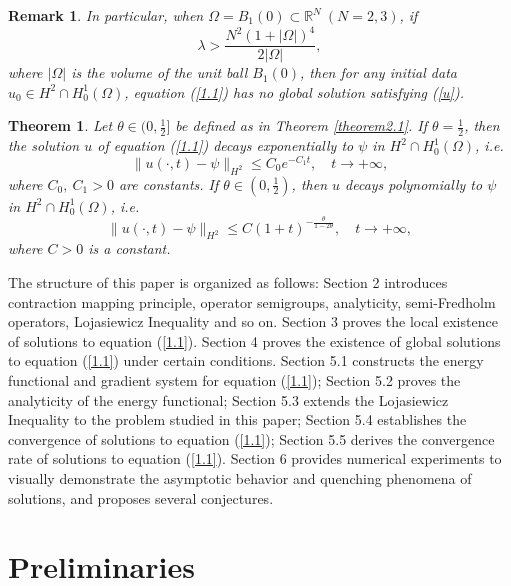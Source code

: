 \documentclass{article}
\numberwithin{equation}{section}
\newtheorem{theorem}{Theorem}[section]
\newtheorem{remark}{Remark}[section]
\begin{document}
\begin{remark}
    In particular, when $\Omega=B_1(0)\subset\mathbb{R}^{N}\ (N=2,3)$, if $$\lambda>\frac{N^2(1+|\Omega|)^4}{2|\Omega|},$$
where $|\Omega|$ is the volume of the unit ball $B_1(0)$, then for any initial data $u_0\in H^2\cap H_0^1(\Omega)$, equation (\ref{1.1}) has no global solution satisfying (\ref{u}).
\end{remark}

\begin{theorem}\label{theorem1.2}
    Let $\theta\in (0,\frac{1}{2}]$ be defined as in Theorem \ref{theorem2.1}. If $\theta=\frac{1}{2}$, then the solution $u$ of equation (\ref{1.1}) decays exponentially to $\psi$ in $H^2\cap H_0^1(\Omega)$, i.e.
    \begin{equation}
        \|u(\cdot,t)-\psi\|_{H^2}\le C_0e^{-C_1t},\quad t\to +\infty,\label{2.33}
    \end{equation}
    where $C_0,\ C_1>0$ are constants.
    If $\theta\in (0,\frac{1}{2})$, then $u$ decays polynomially to $\psi$ in $H^2\cap H_0^1(\Omega)$, i.e.
    \begin{equation}
        \|u(\cdot,t)-\psi\|_{H^2}\le C(1+t)^{-\frac{\theta}{1-2\theta}},\quad t\to +\infty,\label{2.34}
    \end{equation}
    where $C>0$ is a constant.
\end{theorem}

The structure of this paper is organized as follows: Section 2 introduces contraction mapping principle, operator semigroups, analyticity, semi-Fredholm operators, Lojasiewicz Inequality and so on. Section 3 proves the local existence of solutions to equation (\ref{1.1}). Section 4 proves the existence of global solutions to equation (\ref{1.1}) under certain conditions. Section 5.1 constructs the energy functional and gradient system for equation (\ref{1.1}); Section 5.2 proves the analyticity of the energy functional; Section 5.3 extends the Lojasiewicz Inequality to the problem studied in this paper; Section 5.4 establishes the convergence of solutions to equation (\ref{1.1}); Section 5.5 derives the convergence rate of solutions to equation (\ref{1.1}). Section 6 provides numerical experiments to visually demonstrate the asymptotic behavior and quenching phenomena of solutions, and proposes several conjectures.

\section{Preliminaries}
\end{document}
